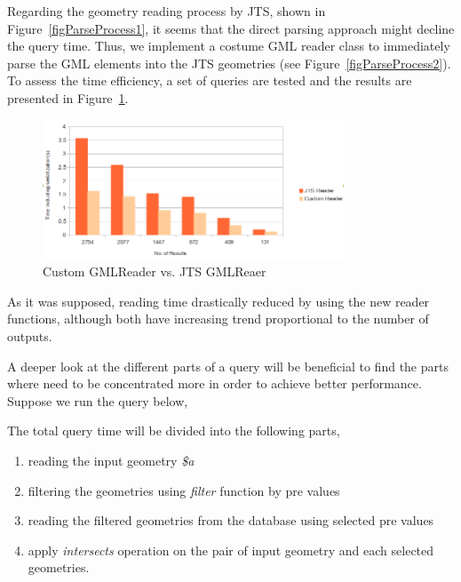 \documentclass[a4paper,12pt]{article}
\begin{document}
Regarding the geometry reading process by JTS, shown in Figure~\ref{figParseProcess1}, it seems that the direct parsing approach might decline the query time. Thus, we implement a costume GML reader class to immediately parse the GML elements into the JTS geometries (see Figure~\ref{figParseProcess2}). To assess the time efficiency, a set of queries are tested and the results are presented in Figure~\ref{figGmlReader}. 

\begin{figure}
\centering
\includegraphics[width=0.8\textwidth]{GmlReader}
\caption{Custom GMLReader vs. JTS GMLReaer}
\label{figGmlReader}
\end{figure}

As it was supposed, reading time drastically reduced by using the new reader functions, although both have increasing trend proportional to the number of outputs.%

A deeper look at the different parts of a query will be beneficial to find the parts where need to be concentrated more in order to achieve better performance. Suppose we run the query below,
\vspace{10px}
\vspace{10px}
The total query time will be divided into the following parts,

\begin{enumerate}
\item reading the input geometry \textit{\$a}
\item filtering the geometries using \textit{filter} function by pre values 
\item reading the filtered geometries from the database using selected pre values
\item apply \textit{intersects} operation on the pair of input geometry and each selected geometries.
\end{enumerate}
\end{document}
